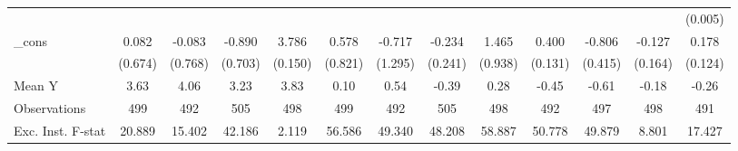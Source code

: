 {\begin{tabular}{l*{12}{c}}
            &                     &                     &                     &                     &                     &                     &                     &                     &                     &                     &                     &     (0.005)         \\
\addlinespace
\_cons      &       0.082         &      -0.083         &      -0.890         &       3.786\sym{***}&       0.578         &      -0.717         &      -0.234         &       1.465         &       0.400\sym{***}&      -0.806\sym{*}  &      -0.127         &       0.178         \\
            &     (0.674)         &     (0.768)         &     (0.703)         &     (0.150)         &     (0.821)         &     (1.295)         &     (0.241)         &     (0.938)         &     (0.131)         &     (0.415)         &     (0.164)         &     (0.124)         \\
\midrule
Mean Y      &        3.63         &        4.06         &        3.23         &        3.83         &        0.10         &        0.54         &       -0.39         &        0.28         &       -0.45         &       -0.61         &       -0.18         &       -0.26         \\
Observations&         499         &         492         &         505         &         498         &         499         &         492         &         505         &         498         &         492         &         497         &         498         &         491         \\
Exc. Inst. F-stat&      20.889         &      15.402         &      42.186         &       2.119         &      56.586         &      49.340         &      48.208         &      58.887         &      50.778         &      49.879         &       8.801         &      17.427         \\
\bottomrule
\end{tabular}
}
